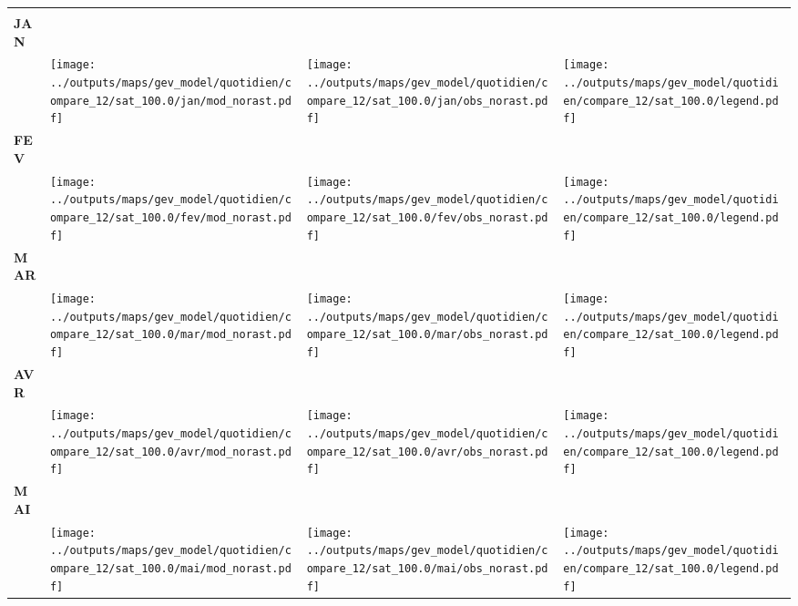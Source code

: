\documentclass[
  letterpaper,
  DIV=11,
  numbers=noendperiod]{scrartcl}
\begin{document}
\begin{longtable*}{m{2.0cm}m{7.9cm}m{7.9cm}m{1cm}}
 & \centering  & \centering  & \tabularnewline
\centering \textbf{JAN} \\[0.2em] \begin{tabular}{r@{\hspace{0.2em}}l}\end{tabular} & \centering \texttt{[image: ../outputs/maps/gev\_model/quotidien/compare\_12/sat\_100.0/jan/mod\_norast.pdf]} & \centering \texttt{[image: ../outputs/maps/gev\_model/quotidien/compare\_12/sat\_100.0/jan/obs\_norast.pdf]} & \centering \texttt{[image: ../outputs/maps/gev\_model/quotidien/compare\_12/sat\_100.0/legend.pdf]} \tabularnewline
\centering \textbf{FEV} \\[0.2em] \begin{tabular}{r@{\hspace{0.2em}}l}\end{tabular} & \centering \texttt{[image: ../outputs/maps/gev\_model/quotidien/compare\_12/sat\_100.0/fev/mod\_norast.pdf]} & \centering \texttt{[image: ../outputs/maps/gev\_model/quotidien/compare\_12/sat\_100.0/fev/obs\_norast.pdf]} & \centering \texttt{[image: ../outputs/maps/gev\_model/quotidien/compare\_12/sat\_100.0/legend.pdf]} \tabularnewline
\centering \textbf{MAR} \\[0.2em] \begin{tabular}{r@{\hspace{0.2em}}l}\end{tabular} & \centering \texttt{[image: ../outputs/maps/gev\_model/quotidien/compare\_12/sat\_100.0/mar/mod\_norast.pdf]} & \centering \texttt{[image: ../outputs/maps/gev\_model/quotidien/compare\_12/sat\_100.0/mar/obs\_norast.pdf]} & \centering \texttt{[image: ../outputs/maps/gev\_model/quotidien/compare\_12/sat\_100.0/legend.pdf]} \tabularnewline
\centering \textbf{AVR} \\[0.2em] \begin{tabular}{r@{\hspace{0.2em}}l}\end{tabular} & \centering \texttt{[image: ../outputs/maps/gev\_model/quotidien/compare\_12/sat\_100.0/avr/mod\_norast.pdf]} & \centering \texttt{[image: ../outputs/maps/gev\_model/quotidien/compare\_12/sat\_100.0/avr/obs\_norast.pdf]} & \centering \texttt{[image: ../outputs/maps/gev\_model/quotidien/compare\_12/sat\_100.0/legend.pdf]} \tabularnewline
\centering \textbf{MAI} \\[0.2em] \begin{tabular}{r@{\hspace{0.2em}}l}\end{tabular} & \centering \texttt{[image: ../outputs/maps/gev\_model/quotidien/compare\_12/sat\_100.0/mai/mod\_norast.pdf]} & \centering \texttt{[image: ../outputs/maps/gev\_model/quotidien/compare\_12/sat\_100.0/mai/obs\_norast.pdf]} & \centering \texttt{[image: ../outputs/maps/gev\_model/quotidien/compare\_12/sat\_100.0/legend.pdf]} \tabularnewline

\end{longtable*}
\end{document}
